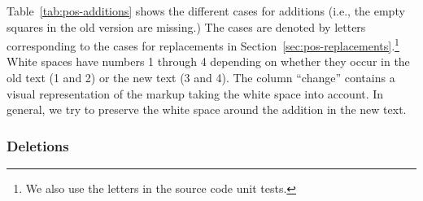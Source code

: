 Table~\ref{tab:pos-additions} shows the different cases for additions (i.e., the empty squares in the old version are missing.)  The cases are denoted by letters corresponding to the cases for replacements in Section~\ref{sec:pos-replacements}.\footnote{We also use the letters in the source code unit tests.} White spaces have numbers 1 through 4 depending on whether they occur in the old text (1 and 2) or the new text (3 and 4).  The column ``change'' contains a visual representation of the markup taking the white space into account.  In general, we try to preserve the white space around the addition in the new text.

\subsubsection{Deletions}

